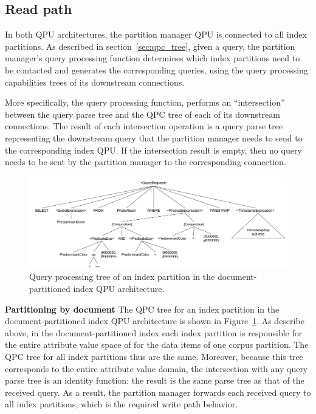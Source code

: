 \subsection{Read path}
In both QPU architectures, the partition manager QPU is connected to all index partitions.
As described in section~\ref{sec:qpc_tree}, given a query,
the partition manager's query processing function determines which index partitions need to be contacted and generates
the corresponding queries, using the query processing capabilities trees of its downstream connections.

More specifically, the query processing function, performs an ``intersection'' between the query parse tree
and the QPC tree of each of its downstream connections.
The result of each intersection operation is a query parse tree representing the downstream query that the partition manager
needs to send to the corresponding index QPU.
If the intersection result is empty, then no query needs to be sent by the partition manager to the corresponding
connection.

\begin{figure}
  \centering
    \includegraphics[width=\textwidth]{./figures/case_studies/qpt_index_partitioning_docs.pdf}
  \caption{Query processing tree of an index partition in the document-partitioned index QPU architecture.}
  \label{fig:qpt_index_partitioning_docs}
\end{figure}

\medskip
\noindent
\textbf{Partitioning by document}
The QPC tree for an index partition in the document-partitioned index QPU architecture is shown in Figure~\ref{fig:qpt_index_partitioning_docs}.
As describe above, in the document-partitioned index each index partition is responsible for the entire attribute value space of
for the data items of one corpus partition.
The QPC tree for all index partitions thus  are the same.
Moreover, because this tree corresponds to the entire attribute value domain, the intersection with any query parse tree
is an identity function:
the result is the same parse tree as that of the received query.
As a result, the partition manager forwards each received query to all index partitions,
which is the required write path behavior.

